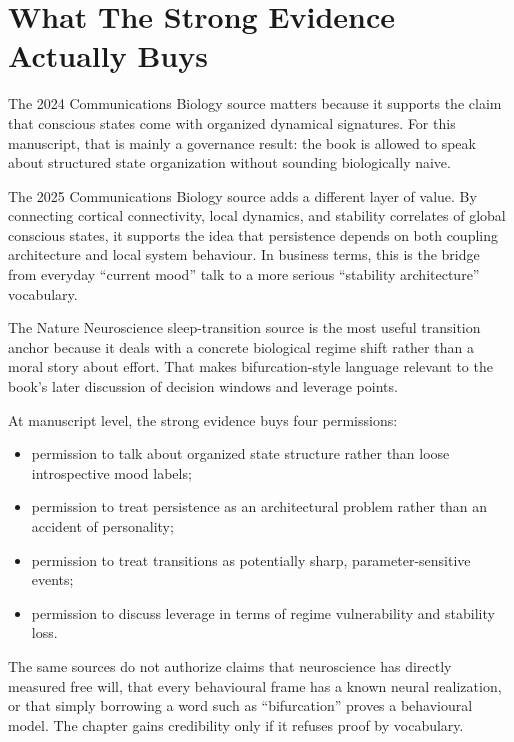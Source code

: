 \section{What The Strong Evidence Actually Buys}

The 2024 Communications Biology source matters because it supports the claim
that conscious states come with organized dynamical signatures. For this
manuscript, that is mainly a governance result: the book is allowed to speak
about structured state organization without sounding biologically naive.

The 2025 Communications Biology source adds a different layer of value. By
connecting cortical connectivity, local dynamics, and stability correlates of
global conscious states, it supports the idea that persistence depends on both
coupling architecture and local system behaviour. In business terms, this is
the bridge from everyday ``current mood'' talk to a more serious ``stability
architecture'' vocabulary.

The Nature Neuroscience sleep-transition source is the most useful transition
anchor because it deals with a concrete biological regime shift rather than a
moral story about effort. That makes bifurcation-style language relevant to the
book's later discussion of decision windows and leverage points.

\begin{discussion}
At manuscript level, the strong evidence buys four permissions:
\begin{itemize}[nosep]
  \item permission to talk about organized state structure rather than loose
        introspective mood labels;
  \item permission to treat persistence as an architectural problem rather than
        an accident of personality;
  \item permission to treat transitions as potentially sharp,
        parameter-sensitive events;
  \item permission to discuss leverage in terms of regime vulnerability and
        stability loss.
\end{itemize}
\end{discussion}

\begin{remark}
The same sources do not authorize claims that neuroscience has directly
measured free will, that every behavioural frame has a known neural
realization, or that simply borrowing a word such as ``bifurcation'' proves a
behavioural model. The chapter gains credibility only if it refuses proof by
vocabulary.
\end{remark}
